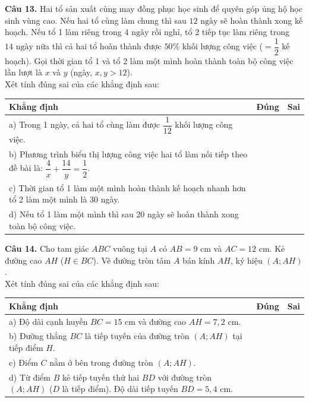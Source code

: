 \documentclass[11pt,a4paper]{article}
\begin{document}
\vspace{1.5mm}
\textbf{Câu 13.} Hai tổ sản xuất cùng may đồng phục học sinh để quyên góp ủng hộ học sinh vùng cao. Nếu hai tổ cùng làm chung thì sau $12\text{ ngày}$ sẽ hoàn thành xong kế hoạch. Nếu tổ 1 làm riêng trong $4\text{ ngày}$ rồi nghỉ, tổ 2 tiếp tục làm riêng trong $14\text{ ngày}$ nữa thì cả hai tổ hoàn thành được $50\%$ khối lượng công việc ($= \dfrac{1}{2}$ kế hoạch). Gọi thời gian tổ 1 và tổ 2 làm một mình hoàn thành toàn bộ công việc lần lượt là $x$ và $y$ (ngày, $x, y > 12$).\\
Xét tính đúng sai của các khẳng định sau:
\begin{center}
\begin{tabularx}{\linewidth}{|X|c|c|}
\hline
\textbf{Khẳng định} & \textbf{Đúng} & \textbf{Sai} \\
\hline
a) Trong 1 ngày, cả hai tổ cùng làm được $\dfrac{1}{12}$ khối lượng công việc. & & \\
\hline
b) Phương trình biểu thị lượng công việc hai tổ làm nối tiếp theo đề bài là: $\dfrac{4}{x} + \dfrac{14}{y} = \dfrac{1}{2}$. & & \\
\hline
c) Thời gian tổ 1 làm một mình hoàn thành kế hoạch nhanh hơn tổ 2 làm một mình là 30 ngày. & & \\
\hline
d) Nếu tổ 1 làm một mình thì sau 20 ngày sẽ hoàn thành xong toàn bộ công việc. & & \\
\hline
\end{tabularx}
\end{center}

\vspace{2mm}
\textbf{Câu 14.} Cho tam giác $ABC$ vuông tại $A$ có $AB = 9\text{ cm}$ và $AC = 12\text{ cm}$. Kẻ đường cao $AH$ ($H \in BC$). Vẽ đường tròn tâm $A$ bán kính $AH$, ký hiệu $(A; AH)$.\\
Xét tính đúng sai của các khẳng định sau:
\begin{center}
\begin{tabularx}{\linewidth}{|X|c|c|}
\hline
\textbf{Khẳng định} & \textbf{Đúng} & \textbf{Sai} \\
\hline
a) Độ dài cạnh huyền $BC = 15\text{ cm}$ và đường cao $AH = 7{,}2\text{ cm}$. & & \\
\hline
b) Đường thẳng $BC$ là tiếp tuyến của đường tròn $(A; AH)$ tại tiếp điểm $H$. & & \\
\hline
c) Điểm $C$ nằm ở bên trong đường tròn $(A; AH)$. & & \\
\hline
d) Từ điểm $B$ kẻ tiếp tuyến thứ hai $BD$ với đường tròn $(A; AH)$ ($D$ là tiếp điểm). Độ dài tiếp tuyến $BD = 5{,}4\text{ cm}$. & & \\
\hline
\end{tabularx}
\end{center}
\end{document}
